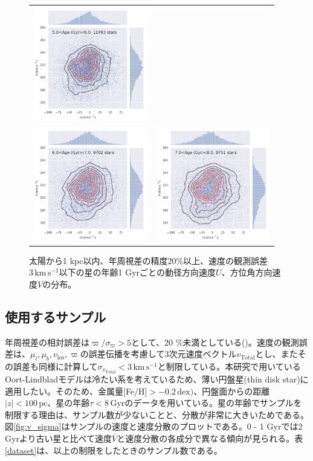 \begin{figure}[htbp]
\begin{tabular}{cc}
\includegraphics[width=5cm]{fig/UV/5to6Gyr_z0.1kpc_hist2d.png}\\
\includegraphics[width=5cm]{fig/UV/6to7Gyr_z0.1kpc_hist2d.png}&
\includegraphics[width=5cm]{fig/UV/7to8Gyr_z0.1kpc_hist2d.png}\\
\end{tabular}
    \caption{太陽から1 kpc以内、年周視差の精度20\%以上、速度の観測誤差$3\,\mathrm{km\,s^{-1}}$以下の星の年齢1 Gyrごとの動径方向速度$U$、方位角方向速度$V$の分布。}
    \label{hist_UV_1Gyr}
\end{figure}


\subsection{使用するサンプル \label{使用するサンプル}}
年周視差の相対誤差は$\varpi/\sigma_{\varpi}>5$として、20 $\%$未満としている(\cite{BJ15})。速度の観測誤差は、$\mu_l,\mu_b,v_{\mathrm{los}},\varpi$の誤差伝播を考慮して3次元速度ベクトル$v_{\mathrm{Total}}$とし、またその誤差も同様に計算して$\sigma_{v_{\mathrm{Total}}}<3\,\mathrm{km\,s^{-1}}$と制限している。本研究で用いているOort-Lindbladモデルは冷たい系を考えているため、薄い円盤星(thin disk star)に適用したい。そのため、金属量[Fe/H]$>-0.2\,\mathrm{dex})$、円盤面からの距離$|z|<100\,\mathrm{pc}$、星の年齢$\tau < 8\,\mathrm{Gyr}$のデータを用いている。星の年齢でサンプルを制限する理由は、サンプル数が少ないことと、分散が非常に大きいためである。図\ref{fig:v_sigma}はサンプルの速度と速度分散のプロットである。0 - 1 Gyrでは2 Gyrより古い星と比べて速度$\overline{V}$と速度分散の各成分で異なる傾向が見られる。表\ref{dataset}は、以上の制限をしたときのサンプル数である。

